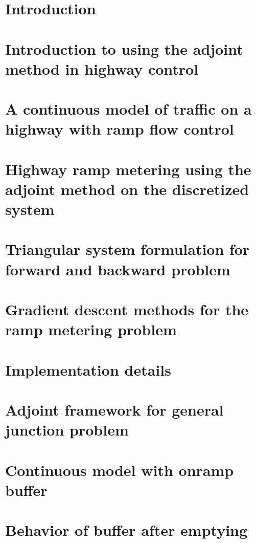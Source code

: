 \section{Introduction}

\section{Introduction to using the adjoint method in highway control}


\section{A continuous model of traffic on a highway with ramp flow control}


\section{Highway ramp metering using the adjoint method on the discretized system}\label{sec:problemFormulation}



\section{Triangular system formulation for forward and backward problem}\label{triangle}


\section{Gradient descent methods for the ramp metering problem}


\section{Implementation details}


\section{Adjoint framework for general junction problem}


\section{Continuous model with onramp buffer}



\section{\label{sec:Behavior-of-buffer}Behavior of buffer after emptying}
